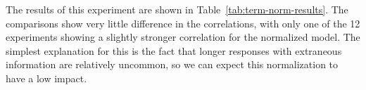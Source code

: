 %

The results of this experiment are shown in Table~\ref{tab:term-norm-results}. The comparisons show very little difference in the correlations, with only one of the 12 experiments showing a slightly stronger correlation for the normalized model. The simplest explanation for this is the fact that longer responses with extraneous information are relatively uncommon, so we can expect this normalization to have a low impact.

